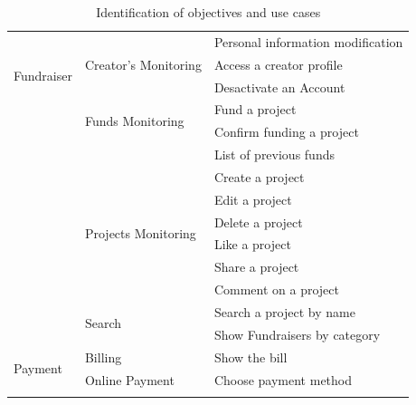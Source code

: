 \begin{longtable}{|m{10em}|m{10em}|m{10em}|}
    \multirow{4}{*}{Fundraiser}    & \multirow{3}{*}{Creator's Monitoring} & Personal information modification       \\\cline{3-3}
                                               &                                       & Access a creator profile                \\\cline{3-3}
                                               &                                       & Desactivate an Account                  \\\cline{2-3}
                                               & \multirow{2}{*}{Funds Monitoring}     & Fund a project                          \\\cline{3-3}
                                               &                                       & Confirm funding a project               \\\cline{3-3}
                                               &                                       & List of previous funds                  \\\cline{2-3}
                                               & \multirow{6}{*}{Projects Monitoring}  & Create a project                        \\\cline{3-3}
                                               &                                       & Edit a project                          \\\cline{3-3}
                                               &                                       & Delete a project                        \\\cline{3-3}
                                               &                                       & Like a project                          \\\cline{3-3}
                                               &                                       & Share a project                         \\\cline{3-3}
                                               &                                       & Comment on a project                    \\\cline{2-3}
                                               & \multirow{2}{*}{Search}               & Search a project by name                \\\cline{3-3}
                                               &                                       & Show Fundraisers by category            \\\hline
    \multirow{2}{*}{Payment}        & \multirow{1}{*}{Billing}              & Show the bill                           \\\cline{2-3}
                                               & \multirow{1}{*}{Online Payment}       & Choose payment method                   \\\hline

    \caption{Identification of objectives and use cases}
    \label{tab:id_objec_uc}
\end{longtable}

